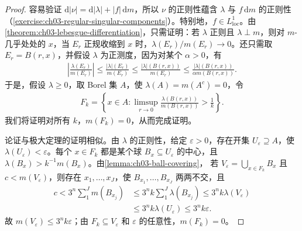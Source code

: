 \documentclass[../../main.tex]{subfiles}%
\begin{document}
\begin{proof}
容易验证 $\mathrm{d}|\nu|=\mathrm{d}|\lambda|+|f|\,\mathrm{d}m$，所以 $\nu$ 的正则性蕴含 $\lambda$ 与 $f\,\mathrm{d}m$ 的正则性（\cref{exercise:ch03-regular-singular-components}）。特别地，$f\in L^1_{\mathrm{loc}}$。由\cref{theorem:ch03-lebesgue-differentiation}，只需证明：若 $\lambda$ 正则且 $\lambda\perp m$，则对 $m$-几乎处处的 $x$，当 $E_r$ 正规收缩到 $x$ 时，$\lambda(E_r)/m(E_r)\to0$。还只需取 $E_r=B(r,x)$，并假设 $\lambda$ 为正测度，因为对某个 $\alpha>0$，有
\begin{align*}
\left|\frac{\lambda(E_r)}{m(E_r)}\right|
\le\frac{|\lambda|(E_r)}{m(E_r)}
\le\frac{|\lambda|(B(r,x))}{m(E_r)}
\le\frac{|\lambda|(B(r,x))}{\alpha m(B(r,x))}.
\end{align*}
于是，假设 $\lambda\ge0$，取 Borel 集 $A$，使 $\lambda(A)=m(A^c)=0$，令
\begin{align*}
F_k=\left\{x\in A:\limsup_{r\to0}\frac{\lambda(B(r,x))}{m(B(r,x))}>\frac1k\right\}.
\end{align*}
我们将证明对所有 $k$，$m(F_k)=0$，从而完成证明。

论证与极大定理的证明相似。由 $\lambda$ 的正则性，给定 $\varepsilon>0$，存在开集 $U_\varepsilon\supseteq A$，使 $\lambda(U_\varepsilon)<\varepsilon$。每个 $x\in F_k$ 都是某个球 $B_x\subseteq U_\varepsilon$ 的中心，且 $\lambda(B_x)>k^{-1}m(B_x)$。由\cref{lemma:ch03-ball-covering}，
若 $V_\varepsilon=\bigcup_{x\in F_k}B_x$ 且 $c<m(V_\varepsilon)$，则存在 $x_1,\ldots,x_J$，使 $B_{x_1},\ldots,B_{x_J}$ 两两不交，且
\begin{align*}
c<3^n\sum_1^Jm(B_{x_j})
&\le3^nk\sum_1^J\lambda(B_{x_j})\le3^nk\lambda(V_\varepsilon)\\
&\le3^nk\lambda(U_\varepsilon)\le3^nk\varepsilon.
\end{align*}
故 $m(V_\varepsilon)\le3^nk\varepsilon$；由 $F_k\subseteq V_\varepsilon$ 和 $\varepsilon$ 的任意性，$m(F_k)=0$。
\end{proof}
\end{document}
